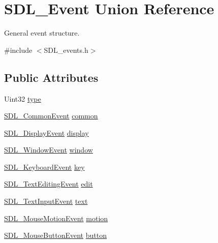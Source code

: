 \hypertarget{union_s_d_l___event}{}\section{S\+D\+L\+\_\+\+Event Union Reference}
\label{union_s_d_l___event}


General event structure.  




{\ttfamily \#include $<$S\+D\+L\+\_\+events.\+h$>$}

\subsection*{Public Attributes}
\begin{DoxyCompactItemize}
\item 
Uint32 \mbox{\hyperlink{union_s_d_l___event_a237648bec242d2d5835f1a4250ddfa46}{type}}
\item 
\mbox{\hyperlink{struct_s_d_l___common_event}{S\+D\+L\+\_\+\+Common\+Event}} \mbox{\hyperlink{union_s_d_l___event_abe5cb8767f93de55163c8ddd4562a7f2}{common}}
\item 
\mbox{\hyperlink{struct_s_d_l___display_event}{S\+D\+L\+\_\+\+Display\+Event}} \mbox{\hyperlink{union_s_d_l___event_afe513d46e191a9791988b9adab705ef6}{display}}
\item 
\mbox{\hyperlink{struct_s_d_l___window_event}{S\+D\+L\+\_\+\+Window\+Event}} \mbox{\hyperlink{union_s_d_l___event_a826936b3275406d857bc6654669fae71}{window}}
\item 
\mbox{\hyperlink{struct_s_d_l___keyboard_event}{S\+D\+L\+\_\+\+Keyboard\+Event}} \mbox{\hyperlink{union_s_d_l___event_ab99927835cc77a9b6bb50b419b4a27df}{key}}
\item 
\mbox{\hyperlink{struct_s_d_l___text_editing_event}{S\+D\+L\+\_\+\+Text\+Editing\+Event}} \mbox{\hyperlink{union_s_d_l___event_a9a7e3b67b2654d4c5fc509676c6a7183}{edit}}
\item 
\mbox{\hyperlink{struct_s_d_l___text_input_event}{S\+D\+L\+\_\+\+Text\+Input\+Event}} \mbox{\hyperlink{union_s_d_l___event_aa4fc65c559d69f33c057c0c23d8414b8}{text}}
\item 
\mbox{\hyperlink{struct_s_d_l___mouse_motion_event}{S\+D\+L\+\_\+\+Mouse\+Motion\+Event}} \mbox{\hyperlink{union_s_d_l___event_ac3c89e190faacbe84280cd539453bab6}{motion}}
\item 
\mbox{\hyperlink{struct_s_d_l___mouse_button_event}{S\+D\+L\+\_\+\+Mouse\+Button\+Event}} \mbox{\hyperlink{union_s_d_l___event_ab6da2fa2687e5f849f270adecc64785f}{button}}

\end{DoxyCompactItemize}
